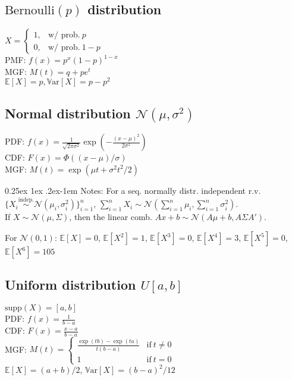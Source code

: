 \documentclass[9pt]{extarticle}
\makeatletter
\newcommand{\EE}{\mathbb{E}}
\newcommand{\var}{\mathbb{V}\text{ar}}
\renewcommand{\paragraph}{%
  \@startsection{paragraph}{4}%
  {\z@}{0.25ex \@plus 1ex \@minus .2ex}{-1em}%
  {\normalfont\normalsize\bfseries}%
}
\newenvironment{noshow}{}{}
\makeatother
\begin{document}
\begin{multicols*}{4}
\begin{noshow}
\subsection*{$\text{Bernoulli}(p)$ distribution}
$\displaystyle X= \begin{cases}1, & \text{w/ prob.}~p \\ 
0, & \text{w/ prob.}~1-p\end{cases}$ \\
PMF: $f(x) = p^x(1-p)^{1-x}$ \\
MGF: $M(t) = q + p e^t$ \\
$\EE[X] = p, \var[X] = p - p^2$


\begin{noshow}
\subsection*{Normal distribution $\mathcal{N}(\mu, \sigma^2)$}
PDF: $\displaystyle f(x) = \frac{1}{\sqrt{2\pi \sigma^2}} \exp \left(-\frac{(x-\mu)^2}{2\sigma^2}\right)$ \\
CDF: $F(x) = \Phi((x-\mu)/\sigma)$ \\
MGF: $M(t) = \exp(\mu t + \sigma^2 t^2/2)$

\paragraph{Notes:} For a seq. normally distr. independent r.v. $\displaystyle \{X_i \overset{\text{indep.}}{\sim} \mathcal{N}(\mu_i,\sigma_i^2)\}_{i=1}^n$, $\sum_{i=1}^n X_i \sim \mathcal{N}(\sum_{i=1}^n \mu_i, \sum_{i=1}^n \sigma_i^2)$. \\
If $X \sim \mathcal{N}(\mu, \Sigma)$, then the linear comb. $Ax+b \sim \mathcal{N}(A\mu + b, A \Sigma A')$.

For $\mathcal{N}(0,1)$: $\EE[X] = 0$, $\EE[X^2] = 1$, $\EE[X^3] = 0$, $\EE[X^4] = 3$, $\EE[X^5] = 0$, $\EE[X^6] = 105$
\end{noshow}


\subsection*{Uniform distribution $U[a,b]$}
$\text{supp}(X) = [a,b ]$ \\
PDF: $f(x) = \frac{1}{b-a}$ \\
CDF: $F(x) = \frac{x-a}{b-a}$ \\
MGF: $\displaystyle M(t) = \begin{cases}
\frac{\exp(tb)-\exp(ta)}{t(b-a)} &\text{if} ~t \neq 0 \\
1 &\text{if} ~t = 0
\end{cases}$ \\
$\EE[X] = (a+b)/2$, $\var[X] = (b-a)^2/12$
\end{noshow}


\end{multicols*}
\end{document}
